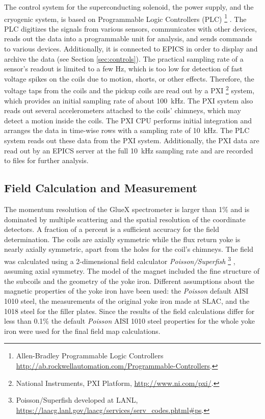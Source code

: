 The control system for the superconducting solenoid, the power supply, 
and the cryogenic system, is based on Programmable Logic
Controllers (PLC)%
\footnote{
  Allen-Bradley Programmable Logic Controllers
  \url{http://ab.rockwellautomation.com/Programmable-Controllers}.
}%
.
The PLC digitizes the signals from various sensors, communicates with
other devices, reads out the data into a programmable unit for
analysis, and sends commands to various devices. Additionally, it is
connected to EPICS in order to display and archive the data (see
Section \ref{sec:controls}).  The practical sampling rate of a
sensor's readout is limited to a few Hz, which is too low for
detection of fast voltage spikes on the coils due to motion, shorts,
or other effects. Therefore, the voltage taps from the coils
and the pickup coils are read
out by a PXI%
\footnote{
  National Instruments, PXI Platform, \url{http://www.ni.com/pxi/}.
}%
system, which provides an initial sampling rate of about 100~kHz. The
PXI system also reads out several accelerometers attached to the
coils' chimneys, which may detect a motion inside the coils. The PXI
CPU performs initial integration and arranges the data in time-wise
rows with a sampling rate of 10~kHz.  The PLC system reads out these
data from the PXI system. Additionally, the PXI data are read out by
an EPICS server at the full 10~kHz sampling rate and are recorded 
to files for further analysis.

\subsection[Field Calculation and Measurement]{
         Field Calculation and Measurement
        \label{sec:sol:field}
}

The momentum resolution of the GlueX spectrometer is larger than
1\% and is dominated by multiple scattering and the spatial
resolution of the coordinate detectors.  A fraction of a percent is a
sufficient accuracy for the field determination.  The coils are
axially symmetric while the flux return yoke is nearly axially
symmetric, apart from the holes for the coil's chimneys. The field was
calculated using a 2-dimensional field calculator {\it
  Poisson/Superfish}%
\footnote{
   Poisson/Superfish developed at LANL,
   \url{https://laacg.lanl.gov/laacg/services/serv_codes.phtml\#ps}.
} 
, assuming axial symmetry.  The model of the magnet included the
fine structure of the subcoils and the geometry of the yoke
iron. Different assumptions about the magnetic properties of the yoke
iron have been used: the {\it Poisson} default AISI 1010 steel, the
measurements of the original yoke iron made at SLAC, and the 1018
steel for the filler plates. Since the results of the field
calculations differ for less than 0.1\% the default {\it Poisson} AISI
1010 steel properties for the whole yoke iron were used for the final
field map calculations.

